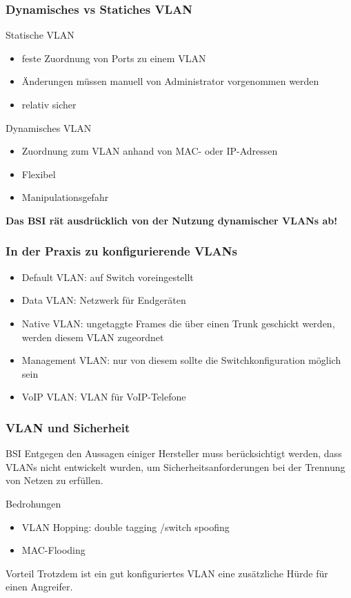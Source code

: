 \documentclass[hyperref={pdfpagelabels=false},xcolor=dvipsnames]{beamer}
\newcommand*\mi{ \item[\color{gray}\scalebox{1.2}{\textbullet}]}
\begin{document}

\begin{frame}
	\frametitle{Dynamisches vs Statiches VLAN}
	Statische VLAN
	\begin{itemize}
		\mi feste Zuordnung von Ports zu einem VLAN
		\mi Änderungen müssen manuell von Administrator vorgenommen werden 
		\mi relativ sicher	
	\end{itemize}
	Dynamisches VLAN
	\begin{itemize}
		\mi Zuordnung zum VLAN anhand von MAC- oder IP-Adressen
		\mi Flexibel
		\mi Manipulationsgefahr
		
			
	\end{itemize}

\textbf{Das BSI rät  ausdrücklich von der Nutzung dynamischer VLANs ab!}
	
\end{frame}

\begin{frame}
	\frametitle{In der Praxis zu konfigurierende VLANs}	
	\begin{itemize}
		\mi Default VLAN: auf Switch voreingestellt
		\mi Data VLAN: Netzwerk für Endgeräten
		\mi Native VLAN: ungetaggte Frames die über einen Trunk geschickt werden, werden diesem VLAN zugeordnet
		\mi Management VLAN: nur von diesem sollte die Switchkonfiguration möglich sein
		\mi VoIP VLAN: VLAN für VoIP-Telefone 	
	\end{itemize}

	
\end{frame}



\begin{frame}
	\frametitle{VLAN und Sicherheit}
	\begin{block}{BSI}
	\glqq Entgegen den Aussagen einiger Hersteller muss berücksichtigt werden, dass VLANs nicht entwickelt wurden, um Sicherheitsanforderungen bei der Trennung von Netzen zu erfüllen.\grqq 
	\end{block}
	
	\begin{block}{Bedrohungen}
		\begin{itemize}
			\mi VLAN Hopping: double tagging /switch spoofing 	
			\mi MAC-Flooding
		\end{itemize}
	\end{block}
	
	\begin{block}{Vorteil}
		Trotzdem ist ein gut konfiguriertes VLAN eine zusätzliche Hürde für einen Angreifer. 
	\end{block}



\end{frame}
\end{document}
